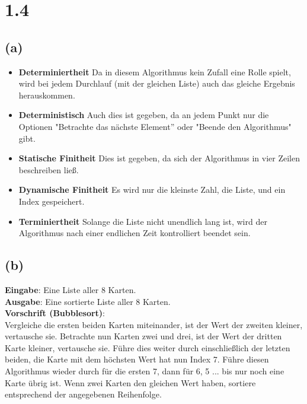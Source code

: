\section*{1.4}
\subsection*{(a)}
\begin{itemize}
    \item \textbf{Determiniertheit} Da in diesem Algorithmus kein Zufall eine Rolle spielt, wird bei jedem Durchlauf (mit der gleichen Liste)
    auch das gleiche Ergebnis herauskommen.
    \item \textbf{Deterministisch} Auch dies ist gegeben, da an jedem Punkt nur die Optionen
    "Betrachte das nächste Element'' oder "Beende den Algorithmus" gibt.
    \item \textbf{Statische Finitheit} Dies ist gegeben, da sich der Algorithmus in vier Zeilen beschreiben ließ.
    \item \textbf{Dynamische Finitheit} Es wird nur die kleinste Zahl, die Liste, und ein Index gespeichert.
    \item \textbf{Terminiertheit} Solange die Liste nicht unendlich lang ist, wird der Algorithmus nach einer endlichen Zeit kontrolliert
    beendet sein.
\end{itemize}\cite{skript}

\subsection*{(b)}
\textbf{Eingabe}: Eine Liste aller 8 Karten.\\
\textbf{Ausgabe}: Eine sortierte Liste aller 8 Karten.\\
\textbf{Vorschrift (Bubblesort)}:\\
Vergleiche die ersten beiden Karten miteinander, ist der Wert der zweiten kleiner, vertausche sie.
Betrachte nun Karten zwei und drei, ist der Wert der dritten Karte kleiner, vertausche sie.
Führe dies weiter durch einschließlich der letzten beiden, die Karte mit dem höchsten Wert hat nun Index 7.
Führe diesen Algorithmus wieder durch für die ersten 7, dann für 6, 5 ... bis nur noch eine Karte übrig ist.
Wenn zwei Karten den gleichen Wert haben, sortiere entsprechend der angegebenen Reihenfolge.